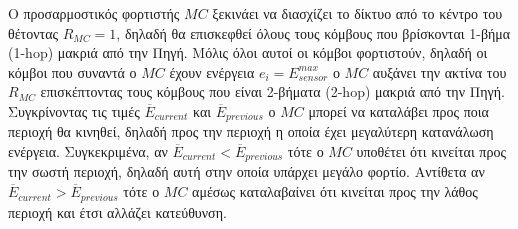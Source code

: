 Ο προσαρμοστικός φορτιστής $MC$ ξεκινάει να διασχίζει το δίκτυο από το κέντρο του θέτοντας $R_{MC}=1$, δηλαδή θα επισκεφθεί όλους τους κόμβους που βρίσκονται 1-βήμα
(1-hop) μακριά από την Πηγή. Μόλις όλοι αυτοί οι κόμβοι φορτιστούν, δηλαδή οι κόμβοι που συναντά ο $MC$ έχουν ενέργεια $e_{i} = E^{max}_{sensor}$ ο $MC$ αυξάνει την
ακτίνα του $R_{MC}$ επισκέπτοντας τους κόμβους που είναι 2-βήματα (2-hop) μακριά από την Πηγή. Συγκρίνοντας τις τιμές $\overline{E}_{current}$ και
$\overline{E}_{previous}$ ο $MC$ μπορεί να καταλάβει προς ποια περιοχή θα κινηθεί, δηλαδή προς την περιοχή η οποία έχει μεγαλύτερη κατανάλωση ενέργεια. Συγκεκριμένα,
αν $\overline{E}_{current} < \overline{E}_{previous}$ τότε ο $MC$ υποθέτει ότι κινείται προς την σωστή περιοχή, δηλαδή αυτή στην οποία υπάρχει μεγάλο φορτίο.
Αντίθετα αν $\overline{E}_{current} > \overline{E}_{previous}$ τότε ο $MC$ αμέσως καταλαβαίνει ότι κινείται προς την λάθος περιοχή και έτσι αλλάζει κατεύθυνση.

